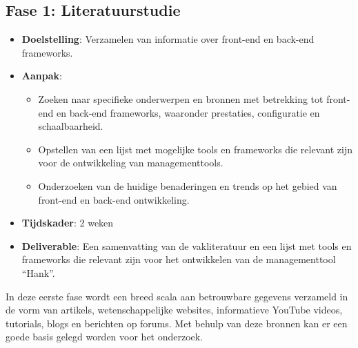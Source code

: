 \documentclass{hogent-article}
\begin{document}
\subsection*{Fase 1: Literatuurstudie}
\begin{itemize}
\item \textbf{Doelstelling}: Verzamelen van informatie over front-end en back-end frameworks.
\item \textbf{Aanpak}:
\begin{itemize}
\item Zoeken naar specifieke onderwerpen en bronnen met betrekking tot front-end en back-end frameworks, waaronder pre\-sta\-ties, configuratie en schaalbaarheid.
\item Opstellen van een lijst met mogelijke tools en frameworks die relevant zijn voor de ontwikkeling van managementtools.
\item Onderzoeken van de huidige benaderingen en trends op het gebied van front-end en back-end ontwikkeling.
\end{itemize}
\item \textbf{Tijdskader}: 2 weken
\item \textbf{Deliverable}: Een samenvatting van de vakliteratuur en een lijst met tools en frameworks die relevant zijn voor het ontwikkelen van de man\-age\-ment\-tool ``Hank''.
\end{itemize}
\bigbreak
In deze eerste fase wordt een breed scala aan betrouwbare gegevens verzameld in de vorm van artikels, wetenschappelijke websites, in\-for\-ma\-tie\-ve YouTube videos, tutorials, blogs en berichten op forums. Met behulp van deze bronnen kan er een goede basis gelegd worden voor het onderzoek.

\end{document}
